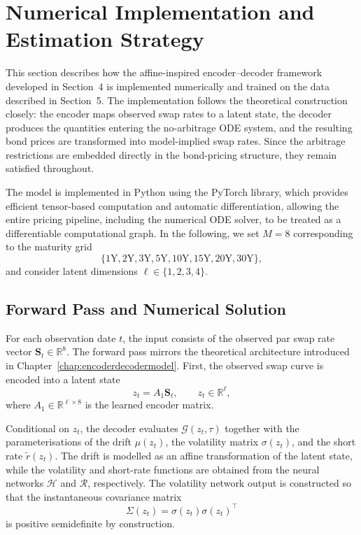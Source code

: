 \chapter{Numerical Implementation and Estimation Strategy}
\label{chap:numerical_implementation}

This section describes how the affine-inspired encoder--decoder framework developed in Section~4 is implemented numerically and trained on the data described in Section~5. The implementation follows the theoretical construction closely: the encoder maps observed swap rates to a latent state, the decoder produces the quantities entering the no-arbitrage ODE system, and the resulting bond prices are transformed into model-implied swap rates. Since the arbitrage restrictions are embedded directly in the bond-pricing structure, they remain satisfied throughout.

The model is implemented in Python using the PyTorch library, which provides efficient tensor-based computation and automatic differentiation, allowing the entire pricing pipeline, including the numerical ODE solver, to be treated as a differentiable computational graph. In the following, we set $M=8$ corresponding to the maturity grid
\[
\{1\text{Y},2\text{Y},3\text{Y},5\text{Y},10\text{Y},15\text{Y},20\text{Y},30\text{Y}\},
\]
and consider latent dimensions $\ell \in \{1,2,3,4\}$.

\section{Forward Pass and Numerical Solution}
\label{sec:forward_pass_numerical_solution}

For each observation date $t$, the input consists of the observed par swap rate vector $\mathbf{S}_t \in \mathbb{R}^8$. The forward pass mirrors the theoretical architecture introduced in Chapter~\ref{chap:encoderdecodermodel}. First, the observed swap curve is encoded into a latent state
\[
z_t = A_1 \mathbf{S}_t,
\qquad
z_t \in \mathbb{R}^\ell,
\]
where $A_1 \in \mathbb{R}^{\ell \times 8}$ is the learned encoder matrix.

Conditional on $z_t$, the decoder evaluates $\mathcal{G}(z_t,\tau)$ together with the parameterisations of the drift $\mu(z_t)$, the volatility matrix $\sigma(z_t)$, and the short rate $\tilde r(z_t)$. The drift is modelled as an affine transformation of the latent state, while the volatility and short-rate functions are obtained from the neural networks $\mathcal{H}$ and $\mathcal{R}$, respectively. The volatility network output is constructed so that the instantaneous covariance matrix
\[
\Sigma(z_t) = \sigma(z_t)\sigma(z_t)^\top
\]
is positive semidefinite by construction.


